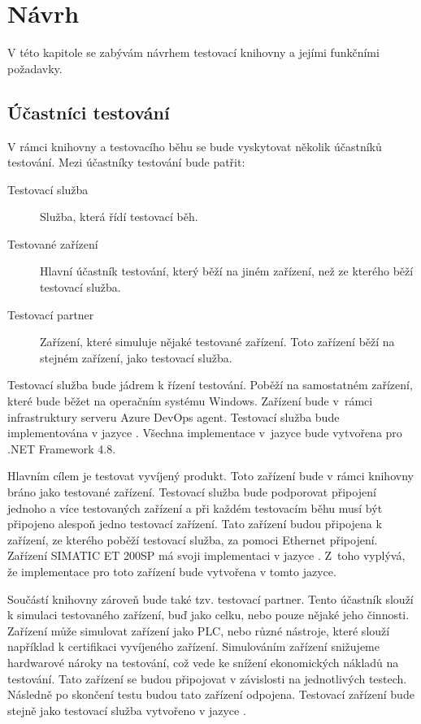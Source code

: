 \chapter{Návrh}\label{chap:design}

V této kapitole se zabývám návrhem testovací knihovny a jejími funkčními požadavky.

\section{Účastníci testování}\label{sec:participants}
V rámci knihovny a testovacího běhu se bude vyskytovat několik účastníků testování. Mezi účastníky testování bude patřit:

\begin{description}
    \item[Testovací služba] Služba, která řídí testovací běh.
    \item[Testované zařízení] Hlavní účastník testování, který běží na jiném zařízení, než ze kterého běží testovací služba. 
    \item[Testovací partner] Zařízení, které simuluje nějaké testované zařízení. Toto zařízení běží na stejném zařízení, jako testovací služba. 
\end{description}

Testovací služba bude jádrem k řízení testování. Poběží na samostatném zařízení, které bude běžet na operačním systému Windows. Zařízení bude v~rámci infrastruktury serveru Azure DevOps agent. Testovací služba bude implementována v jazyce \csharp{}. Všechna implementace v~jazyce \csharp{} bude vytvořena pro .NET Framework 4.8. 

Hlavním cílem je testovat vyvíjený produkt. Toto zařízení bude v rámci knihovny bráno jako testované zařízení. Testovací služba bude podporovat připojení jednoho a více testovaných zařízení a při každém testovacím běhu musí být připojeno alespoň jedno testovací zařízení. Tato zařízení budou připojena k zařízení, ze kterého poběží testovací služba, za pomoci Ethernet připojení. Zařízení SIMATIC ET 200SP má svoji implementaci v jazyce \cpp{}. Z~toho vyplývá, že implementace pro toto zařízení bude vytvořena v tomto jazyce. 

Součástí knihovny zároveň bude také tzv. testovací partner. Tento účastník slouží k simulaci testovaného zařízení, buď jako celku, nebo pouze nějaké jeho činnosti. Zařízení může simulovat zařízení jako PLC, nebo různé nástroje, které slouží například k certifikaci vyvíjeného zařízení. Simulováním zařízení snižujeme hardwarové nároky na testování, což vede ke snížení ekonomických nákladů na testování. Tato zařízení se budou připojovat v závislosti na jednotlivých testech. Následně po skončení testu budou tato zařízení odpojena. Testovací zařízení bude stejně jako testovací služba vytvořeno v jazyce \csharp{}.

